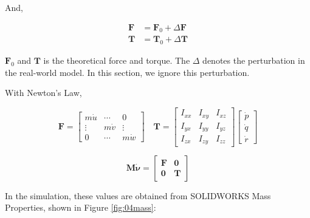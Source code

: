 And,

\begin{align}
    \mathbf{F} &=\mathbf{F}_0+\Delta\mathbf{F} \\
    \mathbf{T} &=\mathbf{T}_0+\Delta\mathbf{T}
\end{align}

$\mathbf{F}_0$ and $\mathbf{T}$ is the theoretical force and torque. The $\Delta$ denotes the perturbation in the real-world model. In this section, we ignore this perturbation.

With Newton's Law,

\begin{equation}
    \mathbf{F}=\left[\begin{array}{ccc}
        m\dot{u} & \cdots & 0 \\
        \vdots & m\dot{v} & \vdots\\
        0 & \cdots & m\dot{w}
    \end{array}\right]\quad \mathbf{T}=\left[\begin{array}{ccc}
        I_{xx} & I_{xy} & I_{xz} \\
        I_{yx} & I_{yy} & I_{yz} \\
        I_{zx} & I_{zy} & I_{zz}
    \end{array}\right]\left[\begin{array}{c}
        \dot{p} \\
        \dot{q} \\
        \dot{r}
    \end{array}\right]
\end{equation}

\begin{equation}
    \mathbf{M}\dot{\mathbf{\nu}}=\left[\begin{array}{cc}
        \mathbf{F} & \boldsymbol{0}  \\
        \boldsymbol{0} & \mathbf{T}
    \end{array}\right]
\end{equation}

In the simulation, these values are obtained from SOLIDWORKS Mass Properties, shown in Figure \ref{fig:04mass}:

